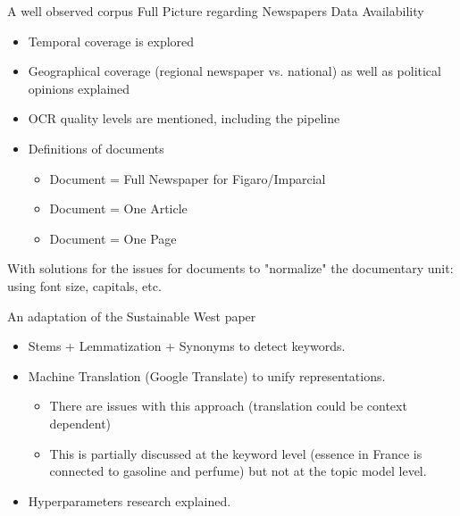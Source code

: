 \documentclass[aspectratio=169]{beamer}
\begin{document}
\begin{frame}{A well observed corpus}
    Full Picture regarding Newspapers Data Availability
    \begin{itemize}
        \item Temporal coverage is explored
        \item Geographical coverage (regional newspaper vs. national) as well as political opinions explained
        \item OCR quality levels are mentioned, including the pipeline
        \item Definitions of documents 
        \begin{itemize}
            \item Document = Full Newspaper for Figaro/Imparcial
            \item Document = One Article
            \item Document = One Page
        \end{itemize}
    \end{itemize}
    With solutions for the issues for documents to "normalize" the documentary unit: using font size, capitals, etc.
\end{frame}

\begin{frame}{An adaptation of the Sustainable West paper}

    \begin{itemize}
        \item Stems + Lemmatization + Synonyms to detect keywords.
        \item Machine Translation (Google Translate) to unify representations.
        \begin{itemize}
            \item There are issues with this approach (translation could be context dependent)
            \item This is partially discussed at the keyword level (essence in France is connected to gasoline and perfume) but not at the topic model level.
        \end{itemize}
        \item Hyperparameters research explained.
    \end{itemize}
    
\end{frame}
\end{document}
